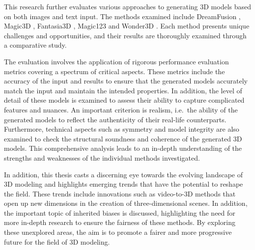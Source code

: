 This research further evaluates various approaches to generating 3D models based on both images and text input. The methods examined include DreamFusion \citep{pooleDreamfusion}, Magic3D \citep{lin2023magic3d}, Fantasia3D \citep{chen2023fantasia3d}, Magic123 \citep{qian2023magic123} and Wonder3D \citep{long2023wonder3d}. Each method presents unique challenges and opportunities, and their results are thoroughly examined through a comparative study. 

The evaluation involves the application of rigorous performance evaluation metrics covering a spectrum of critical aspects. These metrics include the accuracy of the input and results to ensure that the generated models accurately match the input and maintain the intended properties. In addition, the level of detail of these models is examined to assess their ability to capture complicated features and nuances. An important criterion is realism, i.e.~the ability of the generated models to reflect the authenticity of their real-life counterparts. Furthermore, technical aspects such as symmetry and model integrity are also examined to check the structural soundness and coherence of the generated 3D models. This comprehensive analysis leads to an in-depth understanding of the strengths and weaknesses of the individual methods investigated.

In addition, this thesis casts a discerning eye towards the evolving landscape of 3D modeling and highlights emerging trends that have the potential to reshape the field. These trends include innovations such as video-to-3D methods that open up new dimensions in the creation of three-dimensional scenes. In addition, the important topic of inherited biases is discussed, highlighting the need for more in-depth research to ensure the fairness of these methods. By exploring these unexplored areas, the aim is to promote a fairer and more progressive future for the field of 3D modeling.